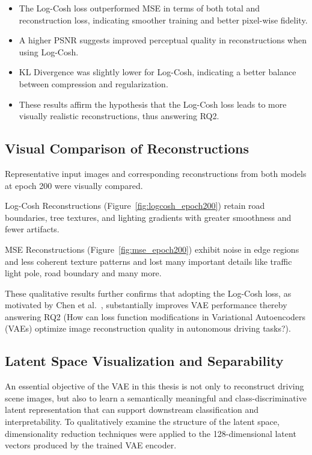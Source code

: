 \begin{itemize}
    \item The Log-Cosh loss outperformed MSE in terms of both total and reconstruction loss, indicating smoother training and better pixel-wise fidelity.
    \item A higher PSNR suggests improved perceptual quality in reconstructions when using Log-Cosh.
    \item KL Divergence was slightly lower for Log-Cosh, indicating a better balance between compression and regularization.
    \item These results affirm the hypothesis that the Log-Cosh loss leads to more visually realistic reconstructions, thus answering RQ2.
\end{itemize}



\subsection{Visual Comparison of Reconstructions} \label{subsubsec:vae_visual_recon}
Representative input images and corresponding reconstructions from both models at epoch 200 were visually compared.

Log-Cosh Reconstructions (Figure~\ref{fig:logcosh_epoch200}) retain road boundaries, tree textures, and lighting gradients with greater smoothness and fewer artifacts.

MSE Reconstructions (Figure~\ref{fig:mse_epoch200}) exhibit noise in edge regions and less coherent texture patterns and lost many important details like traffic light pole, road boundary and many more.

These qualitative results further confirms that adopting the Log-Cosh loss, as motivated by Chen et al.~\cite{chen2019log}, substantially improves VAE performance thereby answering RQ2 (How can loss function modifications in Variational Autoencoders (VAEs) optimize image reconstruction quality in autonomous driving tasks?).


\subsection{Latent Space Visualization and Separability}
\label{subsubsec:vae_latent_space}

An essential objective of the VAE in this thesis is not only to reconstruct driving scene images, but also to learn a semantically meaningful and class-discriminative latent representation that can support downstream classification and interpretability. To qualitatively examine the structure of the latent space, dimensionality reduction techniques were applied to the 128-dimensional latent vectors produced by the trained VAE encoder.

